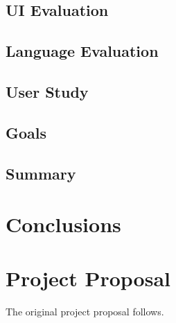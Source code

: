\documentclass[12pt,twoside,notitlepage,xetex]{report}
\begin{document}
\section{UI Evaluation}

\section{Language Evaluation}

\section{User Study}

\section{Goals}

\section{Summary}


\cleardoublepage
\chapter{Conclusions}





\cleardoublepage



\cleardoublepage

\appendix

\chapter{Project Proposal}

The original project proposal follows.


% 
\end{document}
